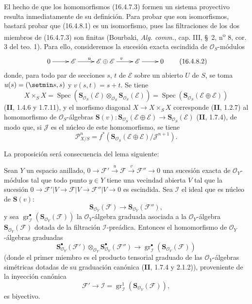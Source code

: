 El hecho de que los homomorfismos (16.4.7.3) formen un sistema proyectivo resulta
inmediatamente de su definición. Para probar que son isomorfismos, bastará
probar que (16.4.8.1) es un isomorfismo, pues las filtraciones de los dos miembros de
(16.4.7.3) son finitas (Bourbaki, \emph{Alg. comm.}, cap. III, \S~2,
n\textsuperscript{o} 8, cor. 3 del teo. 1). Para ello, consideremos la sucesión exacta
escindida de $\mathcal{O}_S$-módulos
\[
  \xymatrix{
    0 \ar[r] & \mathscr{E} \ar[r]^{u} &
    \mathscr{E}\oplus\mathscr{E} \ar[r]^{v} &
    \mathscr{E} \ar[r] & 0
  }
  \tag{16.4.8.2}
  \label{IV.16.4.8.2}
\]
donde, para todo par de secciones $s$, $t$ de $\mathscr{E}$ sobre un abierto
$U$ de $S$, se toma $u(s)=(\setmin s,s)$ y $v(s,t)=s+t$. Se tiene
\[
  X\times_S X=\operatorname{Spec}
  (\mathbf{S}_{\mathcal{O}_S}(\mathscr{E})\otimes_{\mathcal{O}_S}
  \mathbf{S}_{\mathcal{O}_S}(\mathscr{E}))
  =\operatorname{Spec}(\mathbf{S}_{\mathcal{O}_S}
  (\mathscr{E}\oplus\mathscr{E}))
\]
(\textbf{II}, 1.4.6 y 1.7.11), y el morfismo diagonal $X\to X\times_S X$ corresponde
(\textbf{II}, 1.2.7) al homomorfismo de $\mathcal{O}_S$-álgebras
$\mathbf{S}(v):\mathbf{S}_{\mathcal{O}_S}(\mathscr{E}\oplus\mathscr{E})
\to\mathbf{S}_{\mathcal{O}_S}(\mathscr{E})$ (\textbf{II}, 1.7.4), de modo que, si
$\mathscr{J}$ es el núcleo de este homomorfismo, se tiene
\[
  \mathscr{P}_{X/S}^n=f^*(\mathbf{S}_{\mathcal{O}_S}
  (\mathscr{E}\oplus\mathscr{E})/\mathscr{J}^{n+1}).
\]

La proposición será consecuencia del lema siguiente:

\begin{lemma}[16.4.8.3]
\label{IV.16.4.8.3}
Sean $Y$ un espacio anillado,
$0\to\mathscr{F}'\xrightarrow{u}\mathscr{F}\xrightarrow{v}\mathscr{F}''\to0$
una sucesión exacta de $\mathcal{O}_Y$-módulos tal que todo punto $y\in Y$
tiene una vecindad abierta $V$ tal que la sucesión
$0\to\mathscr{F}'|V\to\mathscr{F}|V\to\mathscr{F}''|V\to0$ es escindida.
Sea $\mathscr{I}$ el ideal que es núcleo de
$\mathbf{S}(v)$:
\[
  \mathbf{S}_{\mathcal{O}_Y}(\mathscr{F})\to\mathbf{S}_{\mathcal{O}_Y}(\mathscr{F}''),
\]  y sea
$\operatorname{gr}_{\mathscr{I}}^\bullet
(\mathbf{S}_{\mathcal{O}_Y}(\mathscr{F}))$ la $\mathcal{O}_Y$-álgebra graduada
asociada a la $\mathcal{O}_Y$-álgebra
$\mathbf{S}_{\mathcal{O}_Y}(\mathscr{F})$ \textup{dotada de la filtración
$\mathscr{I}$-preádica}. Entonces el homomorfismo de $\mathcal{O}_Y$-álgebras
graduadas
\[
  \mathbf{S}_{\mathcal{O}_Y}^{\bullet}(\mathscr{F}')
  \otimes_{\mathcal{O}_Y}
  \mathbf{S}_{\mathcal{O}_Y}^{\bullet}(\mathscr{F}'')
  \longrightarrow
  \operatorname{gr}_{\mathscr{I}}^\bullet
  (\mathbf{S}_{\mathcal{O}_Y}(\mathscr{F}))
  \tag{16.4.8.4}
  \label{IV.16.4.8.4}
\]
(donde el primer miembro es el producto tensorial graduado de las
$\mathcal{O}_Y$-álgebras simétricas dotadas de su graduación canónica
\textup{(\textbf{II}, 1.7.4 y 2.1.2)}), proveniente de la inyección canónica
\[
  \mathscr{F}'\longrightarrow\mathscr{I}
  =\operatorname{gr}_{\mathscr{I}}^1
  (\mathbf{S}_{\mathcal{O}_Y}(\mathscr{F})),
\]
es biyectivo.
\end{lemma}

